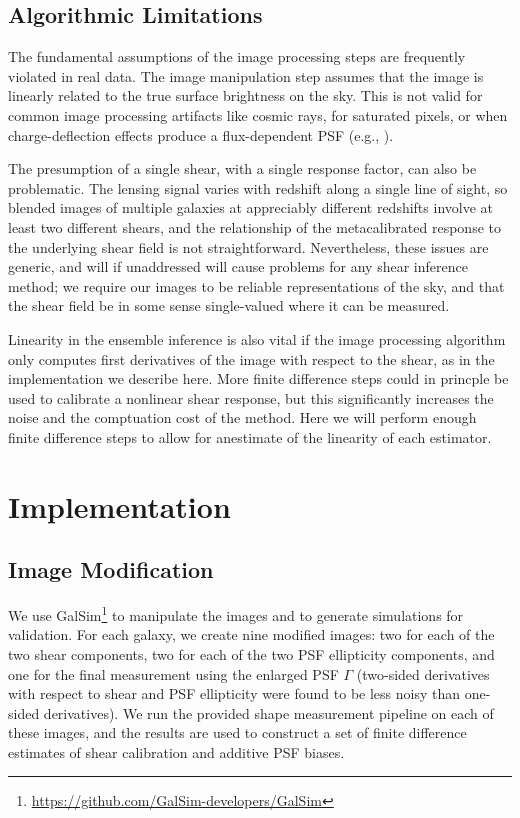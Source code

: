 \documentclass[iop]{emulateapj}
\begin{document}
\subsection{Algorithmic Limitations}
The fundamental assumptions of the image processing steps are
frequently violated in real data. The image manipulation step assumes
that the image is linearly related to the true surface brightness on
the sky. This is not valid for common image processing artifacts like
cosmic rays, for saturated pixels, or when charge-deflection effects
produce a flux-dependent PSF (e.g.,
\citealt{2015JInst..10C5032G}). 

The presumption of a single shear, with a single response factor, can
also be problematic. The lensing signal varies with redshift along a
single line of sight, so blended images of multiple galaxies at
appreciably different redshifts involve at least two different shears,
and the relationship of the metacalibrated response to the underlying
shear field is not straightforward. Nevertheless, these issues are
generic, and will if unaddressed will cause problems for any shear
inference method; we require our images to be reliable representations
of the sky, and that the shear field be in some sense single-valued
where it can be measured.

Linearity in the ensemble inference is also vital if the image
processing algorithm only computes first derivatives of the image with
respect to the shear, as in the implementation we describe here. More
finite difference steps could in princple be used to calibrate a
nonlinear shear response, but this significantly increases the noise
and the comptuation cost of the method. Here we will perform enough
finite difference steps to allow for anestimate of the linearity of
each estimator.


\section{Implementation}
\subsection{Image Modification}
We use
GalSim\footnote{\url{https://github.com/GalSim-developers/GalSim}} to
manipulate the images and to generate simulations for validation. For
each galaxy, we create nine modified images: two for each of the two
shear components, two for each of the two PSF ellipticity components,
and one for the final measurement using the enlarged PSF $\Gamma$
(two-sided derivatives with respect to shear and PSF ellipticity were
found to be less noisy than one-sided derivatives).  We run the
provided shape measurement pipeline on each of these images, and the
results are used to construct a set of finite difference estimates of
shear calibration and additive PSF biases.
\end{document}
